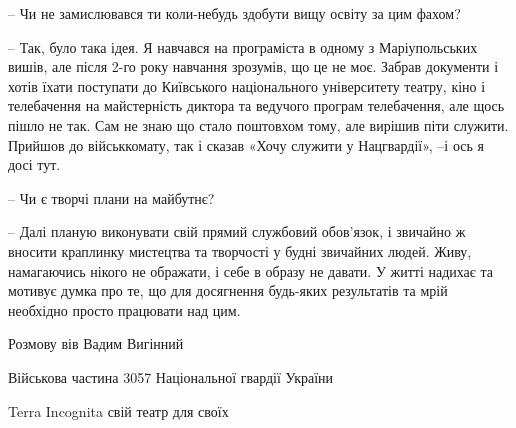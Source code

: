 – Чи не замислювався ти коли-небудь здобути вищу освіту за цим фахом?

– Так, було така ідея. Я навчався на програміста в одному з  Маріупольських
вишів, але після 2-го року навчання зрозумів, що це не моє. Забрав документи і
хотів їхати поступати до Київського національного університету театру, кіно і
телебачення на майстерність диктора та ведучого програм телебачення, але щось
пішло не так. Сам не знаю що стало поштовхом тому, але вирішив піти служити.
Прийшов до військкомату, так і сказав «Хочу служити у Нацгвардії», –і ось я
досі тут.

– Чи є творчі плани на майбутнє? 

– Далі планую виконувати свій прямий службовий обов'язок, і звичайно ж вносити
краплинку мистецтва та творчості у будні звичайних людей. Живу, намагаючись
нікого не ображати, і себе в образу не давати. У житті надихає та мотивує думка
про те, що для досягнення будь-яких результатів та мрій необхідно просто
працювати над цим. 

Розмову вів Вадим Вигінний

Військова частина 3057 Національної гвардії України

Terra Incognita свій театр для своїх
